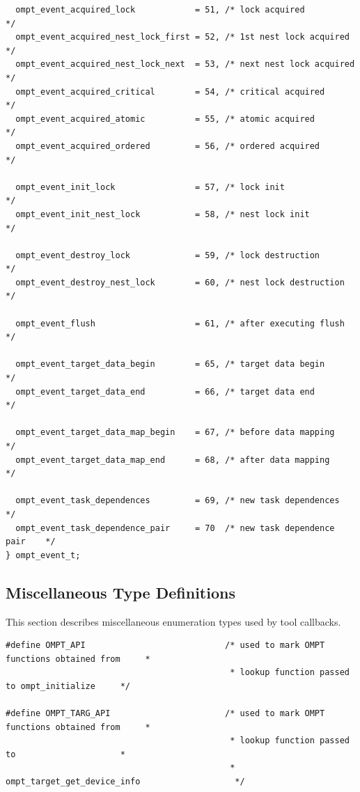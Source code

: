 \documentclass{article}
\begin{document}
{\begin{verbatim}
  ompt_event_acquired_lock            = 51, /* lock acquired              */
  ompt_event_acquired_nest_lock_first = 52, /* 1st nest lock acquired     */
  ompt_event_acquired_nest_lock_next  = 53, /* next nest lock acquired    */
  ompt_event_acquired_critical        = 54, /* critical acquired          */
  ompt_event_acquired_atomic          = 55, /* atomic acquired            */
  ompt_event_acquired_ordered         = 56, /* ordered acquired           */
			            				    	    
  ompt_event_init_lock                = 57, /* lock init                  */
  ompt_event_init_nest_lock           = 58, /* nest lock init             */
  
  ompt_event_destroy_lock             = 59, /* lock destruction           */
  ompt_event_destroy_nest_lock        = 60, /* nest lock destruction      */
			            	 			         
  ompt_event_flush                    = 61, /* after executing flush      */ 

  ompt_event_target_data_begin        = 65, /* target data begin          */
  ompt_event_target_data_end          = 66, /* target data end            */

  ompt_event_target_data_map_begin    = 67, /* before data mapping        */
  ompt_event_target_data_map_end      = 68, /* after data mapping         */
  
  ompt_event_task_dependences         = 69, /* new task dependences        */
  ompt_event_task_dependence_pair     = 70  /* new task dependence pair    */
} ompt_event_t;
\end{verbatim}

\clearpage  
\subsection{Miscellaneous Type Definitions}
\label{appendix:ompt-types:misc}
This section describes miscellaneous enumeration types used by tool callbacks.

\begin{verbatim}
#define OMPT_API                            /* used to mark OMPT functions obtained from     *
                                             * lookup function passed to ompt_initialize     */ 

#define OMPT_TARG_API                       /* used to mark OMPT functions obtained from     *
                                             * lookup function passed to                     *
                                             * ompt_target_get_device_info                   */


\end{verbatim}}
\end{document}
